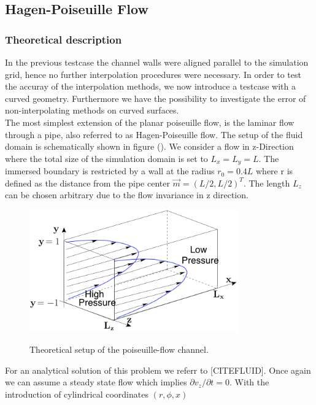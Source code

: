 \newpage
\subsection{Hagen-Poiseuille Flow}

\subsubsection{Theoretical description}

In the previous testcase the channel walls were aligned parallel to the simulation grid, hence no further interpolation procedures
were necessary. In order to test the accuray of the interpolation methods, we now introduce a testcase with a curved geometry.
Furthermore we have the possibility to investigate the error of non-interpolating methods on curved surfaces.\\
The most simplest extension of the planar poiseuille flow, is the laminar flow through a pipe,
also referred to as Hagen-Poiseuille flow. The setup of the fluid domain is schematically shown in figure ().
We consider a flow in z-Direction where the total size of the simulation domain is set to $L_x = L_y = L$.
The immersed boundary is restricted by a wall at the radius $r_0=0.4L$ where r is defined as the distance from the pipe center $\vec{m} = (L/2, L/2)^T$.
The length $L_z$ can be chosen arbitrary due to the flow invariance in z direction.\\
\begin{figure}[!bp]
  \centering
  \includegraphics[width=0.8\textwidth]{gfx/immersed_boundary/val_volpen/poiseuilleflow.png}\label{b}
  \caption{Theoretical setup of the poiseuille-flow channel.}
\end{figure}
For an analytical solution of this problem we referr to [CITEFLUID].
Once again we can assume a steady state flow which implies $\partial v_z/\partial t = 0$. With the introduction of cylindrical coordinates $(r, \phi, x)$
